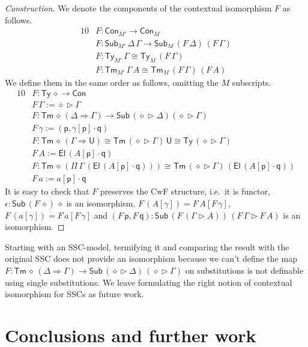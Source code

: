 \documentclass[sigplan,10pt,anonymous,review]{acmart}\settopmatter{printfolios=true,printccs=false,printacmref=false}
\newcommand{\ra}{\rightarrow}
\newcommand{\Ra}{\Rightarrow}
\newcommand{\Ty}{\mathsf{Ty}}
\newcommand{\Tm}{\mathsf{Tm}}
\newcommand{\Con}{\mathsf{Con}}
\newcommand{\Sub}{\mathsf{Sub}}
\newcommand{\p}{\mathsf{p}}
\newcommand{\q}{\mathsf{q}}
\newcommand{\ext}{\mathop{\triangleright}}
\newcommand{\U}{\mathsf{U}}
\newcommand{\El}{\mathsf{El}}
\begin{document}
\begin{proof}[Construction]
  We denote the components of the contextual isomorphism $F$ as follows.
  \begin{alignat*}{10}
    & F : \Con_{M'}\ra\Con_M \\
    & F : \Sub_{M'}\,\Delta\,\Gamma\ra\Sub_M\,(F\,\Delta)\,(F\,\Gamma) \\
    & F : \Ty_{M'}\,\Gamma \cong \Ty_M\,(F\,\Gamma) \\
    & F : \Tm_{M'}\,\Gamma\,A \cong \Tm_M\,(F\,\Gamma)\,(F\,A)
  \end{alignat*}
  We define them in the same order as follows, omitting the $M$ subscripts.
  \begin{alignat*}{10}
    & F : \Ty\,\diamond\ra\Con \\
    & F\,\Gamma := \diamond\ext\Gamma \\
    & F : \Tm\,\diamond\,(\Delta\Ra\Gamma) \ra \Sub\,(\diamond\ext\Delta) (\diamond\ext\Gamma) \\
    & F\,\gamma := (\p,\gamma[\p]\cdot\q) \\
    & F : \Tm\,\diamond\,(\Gamma\Ra\U) \cong \Tm\,(\diamond\ext\Gamma)\,\U \cong \Ty\,(\diamond\ext\Gamma) \\
    & F\,A := \El\,(A[\p]\cdot\q) \\
    & F : \Tm\,\diamond\,(\Pi\,\Gamma\,(\El\,(A[\p]\cdot\q))) \cong \Tm\,(\diamond\ext\Gamma)\,(\El\,(A[\p]\cdot\q)) \\
    & F\,a := a[\p]\cdot\q
  \end{alignat*}
  It is easy to check that $F$ preserves the CwF structure, i.e.\ it
  is functor, $\epsilon : \Sub\,(F\,\diamond)\,\diamond$ is an
  isomorphism, $F\,(A[\gamma]) = F\,A[F\,\gamma]$, $F\,(a[\gamma]) =
  F\,a[F\,\gamma]$ and $(F\,\p,F\,\q) : \Sub\,(F\,(\Gamma\ext
  A))\,(F\,\Gamma\ext F\,A)$ is an isomorphism.
\end{proof}
Starting with an SSC-model, termifying it and comparing the result
with the original SSC does not provide an isomorphism because we can't
define the map $F : \Tm\,\diamond\,(\Delta\Ra\Gamma) \ra
\Sub\,(\diamond\ext\Delta)\,(\diamond\ext\Gamma)$ on substitutions is
not definable using single substitutions. We leave formulating the
right notion of contextual isomorphism for SSCs as future work.

\section{Conclusions and further work}
\label{sec:conclusion}
\end{document}
